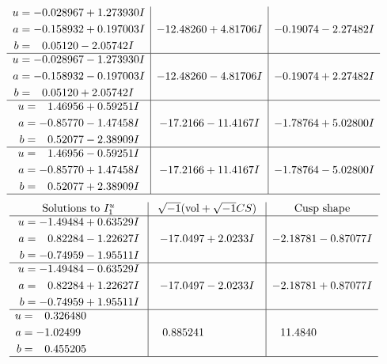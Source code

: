 \documentclass[1p]{elsarticle_modified}
\theoremstyle{definition}
\newcommand{\I}{\sqrt{-1}}
\begin{document}
$$\begin{array}{c|c|c}
\begin{aligned}
u &= -0.028967 + 1.273930 I \\
a &= -0.158932 + 0.197003 I \\
b &= \phantom{-}0.05120 - 2.05742 I\end{aligned}
 & -12.48260 + 4.81706 I & -0.19074 - 2.27482 I \\ \hline\begin{aligned}
u &= -0.028967 - 1.273930 I \\
a &= -0.158932 - 0.197003 I \\
b &= \phantom{-}0.05120 + 2.05742 I\end{aligned}
 & -12.48260 - 4.81706 I & -0.19074 + 2.27482 I \\ \hline\begin{aligned}
u &= \phantom{-}1.46956 + 0.59251 I \\
a &= -0.85770 - 1.47458 I \\
b &= \phantom{-}0.52077 - 2.38909 I\end{aligned}
 & -17.2166 - 11.4167 I & -1.78764 + 5.02800 I \\ \hline\begin{aligned}
u &= \phantom{-}1.46956 - 0.59251 I \\
a &= -0.85770 + 1.47458 I \\
b &= \phantom{-}0.52077 + 2.38909 I\end{aligned}
 & -17.2166 + 11.4167 I & -1.78764 - 5.02800 I\\
 \hline 
 \end{array}$$\newpage$$\begin{array}{c|c|c}  
\text{Solutions to }I^u_{1}& \I (\text{vol} + \sqrt{-1}CS) & \text{Cusp shape}\\
 \hline 
\begin{aligned}
u &= -1.49484 + 0.63529 I \\
a &= \phantom{-}0.82284 - 1.22627 I \\
b &= -0.74959 - 1.95511 I\end{aligned}
 & -17.0497 + 2.0233 I & -2.18781 - 0.87077 I \\ \hline\begin{aligned}
u &= -1.49484 - 0.63529 I \\
a &= \phantom{-}0.82284 + 1.22627 I \\
b &= -0.74959 + 1.95511 I\end{aligned}
 & -17.0497 - 2.0233 I & -2.18781 + 0.87077 I \\ \hline\begin{aligned}
u &= \phantom{-}0.326480\phantom{ +0.000000I} \\
a &= -1.02499\phantom{ +0.000000I} \\
b &= \phantom{-}0.455205\phantom{ +0.000000I}\end{aligned}
 & \phantom{-}0.885241\phantom{ +0.000000I} & \phantom{-}11.4840\phantom{ +0.000000I}\\
 \hline 
 \end{array}$$\newpage\newpage\renewcommand{\arraystretch}{1}
\end{document}
